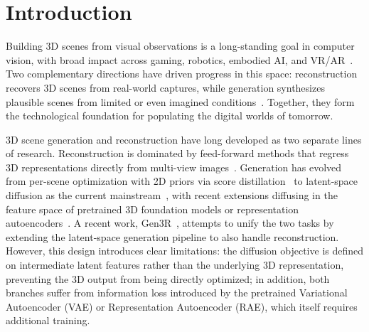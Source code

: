 \section{Introduction}

Building 3D scenes from visual observations is a long-standing goal in computer vision, with broad impact across gaming, robotics, embodied AI, and VR/AR~\citep{ding2025understanding,kong20253d,ye2026world,zhang2025advances}. Two complementary directions have driven progress in this space: reconstruction recovers 3D scenes from real-world captures, while generation synthesizes plausible scenes from limited or even imagined conditions~\citep{zhang2025advances,wang2026feed,li2026thinking}. Together, they form the technological foundation for populating the digital worlds of tomorrow.

3D scene generation and reconstruction have long developed as two separate lines of research. Reconstruction is dominated by feed-forward methods that regress 3D representations directly from multi-view images~\citep{hong2023lrm,charatan2024pixelsplat,szymanowicz2024splatter,xu2025depthsplat,chen2024mvsplat}. Generation has evolved from per-scene optimization with 2D priors via score distillation~\citep{lin2023magic3d,poole2022dreamfusion,tang2023dreamgaussian,wang2023prolificdreamer} to latent-space diffusion as the current mainstream~\citep{yang2025prometheus,go2025splatflow,huang2026gen3r,li2025flashworld}, with recent extensions diffusing in the feature space of pretrained 3D foundation models or representation autoencoders~\citep{gao2026oneworld,sun2026vggt,jang2026repurposing}. A recent work, Gen3R~\citep{huang2026gen3r}, attempts to unify the two tasks by extending the latent-space generation pipeline to also handle reconstruction. However, this design introduces clear limitations: the diffusion objective is defined on intermediate latent features rather than the underlying 3D representation, preventing the 3D output from being directly optimized; in addition, both branches suffer from information loss introduced by the pretrained Variational Autoencoder (VAE) or Representation Autoencoder (RAE), which itself requires additional training.

